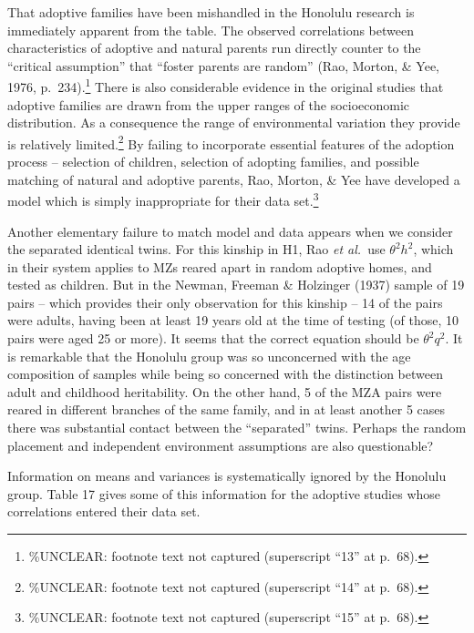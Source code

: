 ﻿\documentclass[12pt]{article}
\begin{document}
That adoptive families have been mishandled in the Honolulu research is immediately apparent from the table. The observed correlations between characteristics of adoptive and natural parents run directly counter to the ``critical assumption'' that ``foster parents are random'' (Rao, Morton, \& Yee, 1976, p.\ 234).\footnote{\%UNCLEAR: footnote text not captured (superscript ``13'' at p.\ 68).} There is also considerable evidence in the original studies that adoptive families are drawn from the upper ranges of the socioeconomic distribution. As a consequence the range of environmental variation they provide is relatively limited.\footnote{\%UNCLEAR: footnote text not captured (superscript ``14'' at p.\ 68).} By failing to incorporate essential features of the adoption process -- selection of children, selection of adopting families, and possible matching of natural and adoptive parents, Rao, Morton, \& Yee have developed a model which is simply inappropriate for their data set.\footnote{\%UNCLEAR: footnote text not captured (superscript ``15'' at p.\ 68).}

Another elementary failure to match model and data appears when we consider the separated identical twins. For this kinship in H1, Rao \emph{et al.}\ use $\theta^2h^2$, which in their system applies to MZs reared apart in random adoptive homes, and tested as children. But in the Newman, Freeman \& Holzinger (1937) sample of 19 pairs -- which provides their only observation for this kinship -- 14 of the pairs were adults, having been at least 19 years old at the time of testing (of those, 10 pairs were aged 25 or more). It seems that the correct equation should be $\theta^2q^2$. It is remarkable that the Honolulu group was so unconcerned with the age composition of samples while being so concerned with the distinction between adult and childhood heritability. On the other hand, 5 of the MZA pairs were reared in different branches of the same family, and in at least another 5 cases there was substantial contact between the ``separated'' twins. Perhaps the random placement and independent environment assumptions are also questionable?

Information on means and variances is systematically ignored by the Honolulu group. Table 17 gives some of this information for the adoptive studies whose correlations entered their data set.
\end{document}
